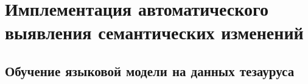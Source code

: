 \documentclass[LI,VKR]{HSEUniversity}
\begin{document}
%
%
%
%
%

\chapter{Имплементация автоматического выявления семантических изменений}

\section{Обучение языковой модели на данных тезауруса}
\end{document}
